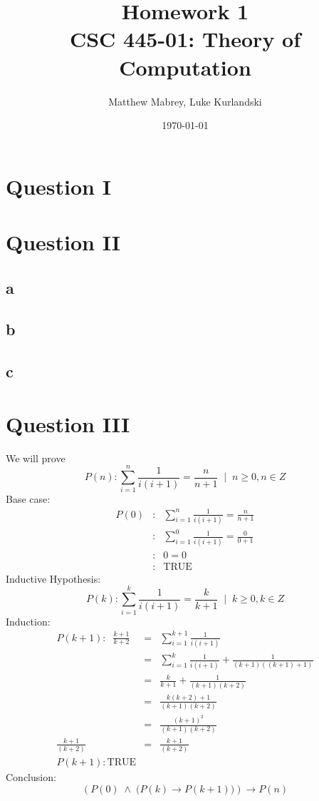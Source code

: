 \documentclass{article}
\title{Homework 1\\[0.2em]\smaller{}CSC 445-01: Theory of Computation}
\author{Matthew Mabrey, Luke Kurlandski}
\date{\today}
\begin{document}
\maketitle

\section*{Question I}

\section*{Question II}

\subsection*{a}

\subsection*{b}

\subsection*{c}

\section*{Question III}
We will prove
$$
P(n) \colon \sum^n_{i=1} \frac{1}{i(i+1)} = \frac{n}{n+1} \;\; \biggr | \;\; n \geq 0, n \in Z
$$
Base case:
\begin{eqnarray*}
P(0) &\colon& \sum^n_{i=1} \frac{1}{i(i+1)} = \frac{n}{n+1} \\
&\colon& \sum^0_{i=1} \frac{1}{i(i+1)} = \frac{0}{0+1} \\
&\colon& 0 = 0 \\
&\colon& \textrm{TRUE}
\end{eqnarray*}
Inductive Hypothesis:
$$
P(k) \colon \sum^k_{i=1} \frac{1}{i(i+1)} = \frac{k}{k+1} \;\; \biggr | \;\; k \geq 0, k \in Z
$$
Induction:
\begin{eqnarray*}
P(k+1) \colon \;\; \frac{k+1}{k+2} &=& \sum^{k+1}_{i=1} \frac{1}{i(i+1)}  \\
&=& \sum^k_{i=1} \frac{1}{i(i+1)} + \frac{1}{(k+1)((k+1)+1)} \\
&=& \frac{k}{k+1} + \frac{1}{(k+1)(k+2)} \\ 
&=& \frac{k(k+2) + 1}{(k+1)(k+2)} \\ 
&=& \frac{(k+1)^2}{(k+1)(k+2)} \\
\frac{k+1}{(k+2)} &=& \frac{k+1}{(k+2)} \\
P(k+1) \colon \textrm{TRUE}
\end{eqnarray*}
Conclusion:
$$
\left (  P(0) \; \land \; \biggr ( P(k) \rightarrow P(k+1) \biggr ) \right ) \rightarrow P(n) 
$$
\end{document}
